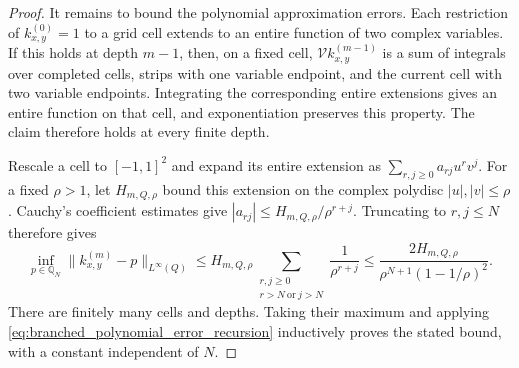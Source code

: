 \begin{proof}
It remains to bound the polynomial approximation errors. Each restriction of $k_{x,y}^{(0)}=1$ to a grid cell extends to an entire function of two complex variables. If this holds at depth $m-1$, then, on a fixed cell, $\mathcal V k_{x,y}^{(m-1)}$ is a sum of integrals over completed cells, strips with one variable endpoint, and the current cell with two variable endpoints. Integrating the corresponding entire extensions gives an entire function on that cell, and exponentiation preserves this property. The claim therefore holds at every finite depth.

Rescale a cell to $[-1,1]^2$ and expand its entire extension as $\sum_{r,j\geq0}a_{rj}u^rv^j$. For a fixed $\rho>1$, let $H_{m,Q,\rho}$ bound this extension on the complex polydisc $|u|,|v|\leq\rho$. Cauchy's coefficient estimates give $|a_{rj}|\leq H_{m,Q,\rho}/\rho^{r+j}$. Truncating to $r,j\leq N$ therefore gives
\begin{equation*}
    \inf_{p\in\mathbb Q_N}\|k_{x,y}^{(m)}-p\|_{L^\infty(Q)}
    \leq H_{m,Q,\rho}
          \sum_{\substack{r,j\geq0\\r>N\ \mathrm{or}\ j>N}}\frac{1}{\rho^{r+j}}
    \leq\frac{2H_{m,Q,\rho}}{\rho^{N+1}(1-1/\rho)^2}.
\end{equation*}
There are finitely many cells and depths. Taking their maximum and applying \eqref{eq:branched_polynomial_error_recursion} inductively proves the stated bound, with a constant independent of $N$.
\end{proof}
